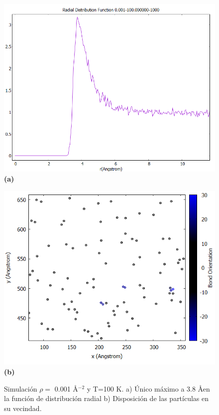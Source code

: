 \begin{figure}[H]
	\centering
	\begin{minipage}[b]{0.475\textwidth}
		\centering
		\includegraphics[width=\textwidth]{grafico_3x07_0.001-100_rdf_zoom.png}
		\textbf{(a)}
	\end{minipage}%
	\hfill
	\begin{minipage}[b]{0.45\textwidth}
		\centering
		\includegraphics[width=\textwidth]{grafico_3x06_0.001-100_dinamica_zoom.png}
		\textbf{(b)}
	\end{minipage}
	
	\caption{\footnotesize Simulación  $\rho=$ 0.001 \AA$^{-2}$ y  T=100 K. a) Único máximo a 3.8 \AA en la función de distribución radial b) Disposición de las partículas en su vecindad.}
	\label{fig:d001t100}
\end{figure}
	

